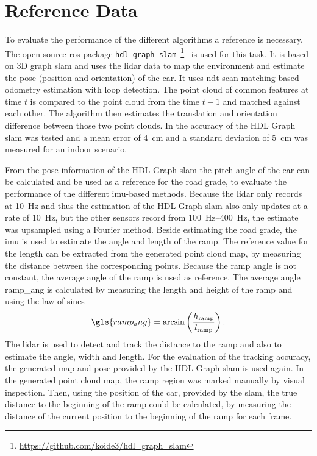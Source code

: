 \section{Reference Data}
To evaluate the performance of the different algorithms a reference is necessary.
The open-source \gls{ros} package \texttt{hdl\_graph\_slam}~\footnote{\url{https://github.com/koide3/hdl_graph_slam}}~\cite{Koide2019} is used for this task.
It is based on 3D graph \gls{slam} and uses the \gls{lidar} data to map the environment and estimate the pose (position and orientation) of the car.
It uses \gls{ndt} scan matching-based odometry estimation with loop detection.
The point cloud of common features at time $t$ is compared to the point cloud from the time $t-1$ and matched against each other.
The algorithm then estimates the translation and orientation difference between those two point clouds.
In \cite{Akpnar2021} the accuracy of the HDL Graph \gls{slam} was tested and a mean error of \SI{4}{\cm} and a standard deviation of \SI{5}{\cm} was measured for an indoor scenario.\par
From the pose information of the HDL Graph \gls{slam} the pitch angle of the car can be calculated and be used as a reference for the road grade, to evaluate the performance of the different \gls{imu}-based methods.
Because the \gls{lidar} only records at \SI{10}{\hertz} and thus the estimation of the HDL Graph \gls{slam} also only updates at a rate of \SI{10}{\hertz}, but the other sensors record from \SIrange{100}{400}{\hertz}, the estimate was upsampled using a Fourier method.
Beside estimating the road grade, the \gls{imu} is used to estimate the angle and length of the ramp.
The reference value for the length can be extracted from the generated point cloud map, by measuring the distance between the corresponding points.
Because the ramp angle is not constant, the average angle of the ramp is used as reference.
The average angle \gls{ramp_ang} is calculated by measuring the length and height of the ramp and using the law of sines
\begin{equation}
    \gls{ramp_ang} = \arcsin\left(\frac{h_\mathrm{ramp}}{l_\mathrm{ramp}}\right).
\end{equation}
The \gls{lidar} is used to detect and track the distance to the ramp and also to estimate the angle, width and length.
For the evaluation of the tracking accuracy, the generated map and pose provided by the HDL Graph \gls{slam} is used again.
In the generated point cloud map, the ramp region was marked manually by visual inspection.
Then, using the position of the car, provided by the \gls{slam}, the true distance to the beginning of the ramp could be calculated, by measuring the distance of the current position to the beginning of the ramp for each frame.\par
